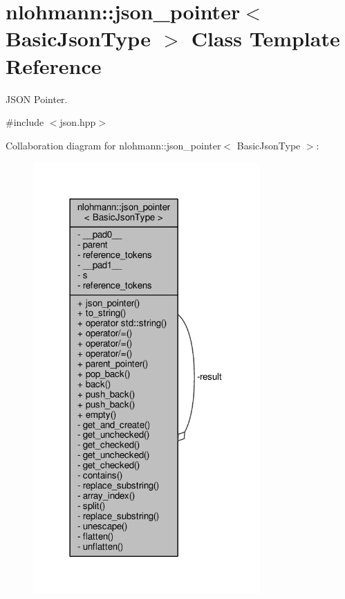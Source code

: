 \hypertarget{classnlohmann_1_1json__pointer}{}\section{nlohmann\+:\+:json\+\_\+pointer$<$ Basic\+Json\+Type $>$ Class Template Reference}
\label{classnlohmann_1_1json__pointer}


J\+S\+ON Pointer.  




{\ttfamily \#include $<$json.\+hpp$>$}



Collaboration diagram for nlohmann\+:\+:json\+\_\+pointer$<$ Basic\+Json\+Type $>$\+:
\nopagebreak
\begin{figure}[H]
\begin{center}
\leavevmode
\includegraphics[width=246pt]{classnlohmann_1_1json__pointer__coll__graph}
\end{center}
\end{figure}
